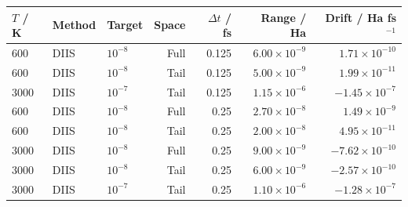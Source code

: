 \begin{tabular}{lllrrrr}\toprule
$T$ / K & Method & Target & Space & $\Delta t$ / fs & Range / Ha & Drift / Ha fs$^{-1}$\\\midrule
600 & DIIS & $10^{-8}$ & Full & 0.125 & $6.00\times10^{-9}$ & $1.71\times10^{-10}$\\
600 & DIIS & $10^{-8}$ & Tail & 0.125 & $5.00\times10^{-9}$ & $1.99\times10^{-11}$\\
3000 & DIIS & $10^{-7}$ & Tail & 0.125 & $1.15\times10^{-6}$ & $-1.45\times10^{-7}$\\
600 & DIIS & $10^{-8}$ & Full & 0.25 & $2.70\times10^{-8}$ & $1.49\times10^{-9}$\\
600 & DIIS & $10^{-8}$ & Tail & 0.25 & $2.00\times10^{-8}$ & $4.95\times10^{-11}$\\
3000 & DIIS & $10^{-8}$ & Full & 0.25 & $9.00\times10^{-9}$ & $-7.62\times10^{-10}$\\
3000 & DIIS & $10^{-8}$ & Tail & 0.25 & $6.00\times10^{-9}$ & $-2.57\times10^{-10}$\\
3000 & DIIS & $10^{-7}$ & Tail & 0.25 & $1.10\times10^{-6}$ & $-1.28\times10^{-7}$\\
\bottomrule\end{tabular}
